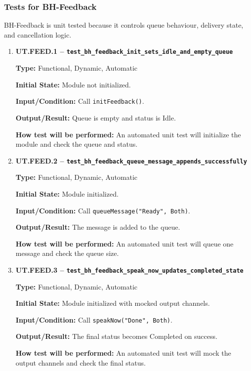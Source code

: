 \documentclass[12pt, titlepage]{article}
\begin{document}
\subsubsection{Tests for BH-Feedback}

BH-Feedback is unit tested because it controls queue behaviour,
delivery state, and cancellation logic.

\begin{enumerate}

\item \textbf{UT.FEED.1 --
\texttt{test\_bh\_feedback\_init\_sets\_idle\_and\_empty\_queue}}

\textbf{Type:} Functional, Dynamic, Automatic

\textbf{Initial State:} Module not initialized.

\textbf{Input/Condition:} Call \texttt{initFeedback()}.

\textbf{Output/Result:} Queue is empty and status is Idle.

\textbf{How test will be performed:} An automated unit test will initialize the
module and check the queue and status.

\item \textbf{UT.FEED.2 --
\texttt{test\_bh\_feedback\_queue\_message\_appends\_successfully}}

\textbf{Type:} Functional, Dynamic, Automatic

\textbf{Initial State:} Module initialized.

\textbf{Input/Condition:} Call \texttt{queueMessage("Ready", Both)}.

\textbf{Output/Result:} The message is added to the queue.

\textbf{How test will be performed:} An automated unit test will queue one
message and check the queue size.

\item \textbf{UT.FEED.3 --
\texttt{test\_bh\_feedback\_speak\_now\_updates\_completed\_state}}

\textbf{Type:} Functional, Dynamic, Automatic

\textbf{Initial State:} Module initialized with mocked output channels.

\textbf{Input/Condition:} Call \texttt{speakNow("Done", Both)}.

\textbf{Output/Result:} The final status becomes Completed on success.

\textbf{How test will be performed:} An automated unit test will mock the
output channels and check the final status.


\end{enumerate}
\end{document}
